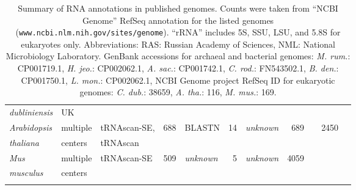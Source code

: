 \begin{footnotesize}
\begin{table}
\begin{center}
\begin{tabular}{|ll|lr|lr|lr|c|rr|}
\emph{dubliniensis}                      & UK                &               &          &                &    &                &          & & & \\ \cline{1-8} \cline{9-11}
\emph{Arabidopsis}                       & multiple          & tRNAscan-SE,  & 688      & BLASTN         & 14 & \emph{unknown} & 689      & & 2450 & \\
\emph{thaliana}                          & centers           & tRNAscan      &          &                &    &                &          & & & \\ \cline{1-8} \cline{9-11}
\emph{Mus}                               & multiple          & tRNAscan-SE   & 509  & \emph{unknown} & 5  & \emph{unknown} & 4059 & & & \\
\emph{musculus}                          & centers           &               &          &                &    &                &          & & & \\ %
\cline{1-8} \cline{9-11}
\multicolumn{11}{l}{} \\
\end{tabular}

\caption{Summary of RNA annotations in published genomes.  Counts were
  taken from ``NCBI Genome'' RefSeq annotation for the listed genomes
  (\texttt{www.ncbi.nlm.nih.gov/sites/genome}). 
  ``rRNA'' includes 5S, SSU, LSU, and 5.8S for
  eukaryotes only. Abbreviations: RAS: Russian Academy of Sciences, NML: National Microbiology Laboratory.
  GenBank accessions for archaeal and bacterial genomes:
  \emph{M. rum.}: CP001719.1,
  \emph{H. jeo.}: CP002062.1,
  \emph{A. sac.}: CP001742.1,
  \emph{C. rod.}: FN543502.1,
  \emph{B. den.}: CP001750.1,
  \emph{L. mon.}: CP002062.1,
  NCBI Genome project RefSeq ID for eukaryotic genomes:
  \emph{C. dub.}: 38659,
  \emph{A. tha.}:   116,
  \emph{M. mus.}:   169.}
\end{center}
\end{table}
\end{footnotesize}



